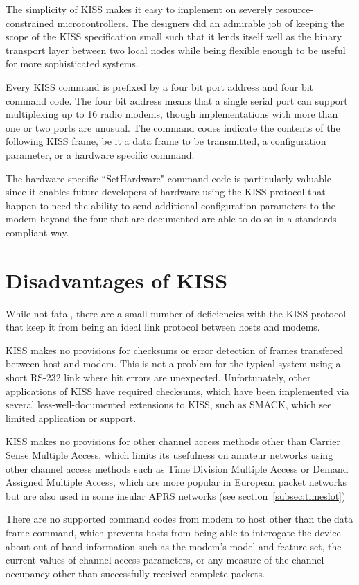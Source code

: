 The simplicity of KISS makes it easy to implement on severely resource-constrained
microcontrollers. The designers did an admirable job of keeping the scope of the KISS
specification small such that it lends itself well as the binary transport
layer between two local nodes while being flexible enough to be useful for
more sophisticated systems.

Every KISS command is prefixed by a four bit port address and four bit 
command code. The four bit address means that a single serial port can 
support multiplexing up to 16 radio modems, though implementations with more
than one or two ports are unusual. The command codes indicate the contents of the 
following KISS frame, be it a data frame to be transmitted, a configuration
parameter, or a hardware specific command.

The hardware specific ``SetHardware" command code is particularly valuable
since it enables future developers of hardware using the KISS protocol
that happen to need the ability to send additional configuration parameters
to the modem beyond the four that are documented are able to do so in a
standards-compliant way.

\section{Disadvantages of KISS}

While not fatal, there are a small number of deficiencies with the KISS
protocol that keep it from being an ideal link protocol between hosts and modems.

KISS makes no provisions for checksums or error detection of frames transfered
between host and modem. This is not a problem for the typical system
using a short RS-232 link where bit errors are unexpected.
Unfortunately, other applications of KISS have required checksums, which
have been implemented via
several less-well-documented extensions to KISS, such as SMACK\cite{smack}, 
which see limited application or support.

KISS makes no provisions for other channel access methods other than
Carrier Sense Multiple Access, which limits its usefulness on amateur networks
using other channel access methods such as Time Division Multiple Access
or Demand Assigned Multiple Access, which are more popular in European 
packet networks but are also used in some insular APRS networks 
(see section~\ref{subsec:timeslot})

There are no supported command codes from modem to host other than the data frame
command, which prevents hosts from being able to interogate the device 
about out-of-band information such as the modem's model and feature set,
the current values of channel access parameters, or any measure of the 
channel occupancy other than successfully received complete packets.



